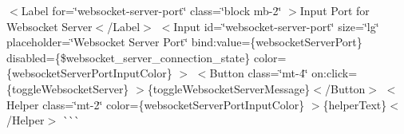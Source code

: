  $<$\+Label for=\char`\"{}websocket-\/server-\/port\char`\"{} class=\char`\"{}block mb-\/2\char`\"{}         $>$Input Port for Websocket Server$<$/\+Label$>$ $<$\+Input         id=\char`\"{}websocket-\/server-\/port\char`\"{}         size=\char`\"{}lg\char`\"{}         placeholder=\char`\"{}\+Websocket Server Port\char`\"{}         bind\+:value=\{websocket\+Server\+Port\}         disabled=\{\$websocket\+\_\+server\+\_\+connection\+\_\+state\}         color=\{websocket\+Server\+Port\+Input\+Color\}     $>$ $<$\+Button class=\char`\"{}mt-\/4\char`\"{} on\+:click=\{toggle\+Websocket\+Server\}         $>$\{toggle\+Websocket\+Server\+Message\}$<$/\+Button$>$ $<$\+Helper class=\char`\"{}mt-\/2\char`\"{} color=\{websocket\+Server\+Port\+Input\+Color\}         $>$\{helper\+Text\}$<$/\+Helper$>$  \`{}\`{}\`{} 